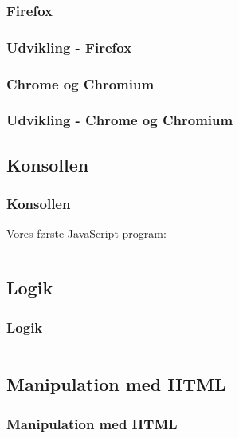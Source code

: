 \subsubsection{Firefox}
\begin{frame}
    \frametitle{Udvikling - Firefox}
    \begin{center}
    \end{center}
\end{frame}

\subsubsection{Chrome og Chromium}
\begin{frame}
    \frametitle{Udvikling - Chrome og Chromium}
    \begin{center}
    \end{center}
\end{frame}

\subsection{Konsollen}
\begin{frame}
    \frametitle{Konsollen}
    Vores første JavaScript program:
    \inputminted{javascript}{../src/frontend/part2_hello/logic.js}
\end{frame}

\subsection{Logik}
\begin{frame}
    \frametitle{Logik}
    \inputminted{javascript}{../src/frontend/part2_console/logic.js}
\end{frame}

\subsection{Manipulation med HTML}
\begin{frame}
    \frametitle{Manipulation med HTML}
    \vspace{-1mm}
    \inputminted[highlightlines={1,9,11,13},breaklines=true]{javascript}{../src/frontend/part2_html/logic.js}
\end{frame}

